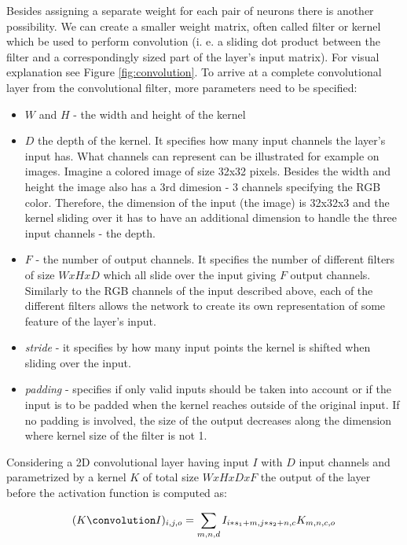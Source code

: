 Besides assigning a separate weight for each pair of neurons there is another possibility.
We can create a smaller weight matrix, often called filter or kernel which be used to perform convolution (i. e. a sliding dot product between the filter and a correspondingly sized part of the layer's input matrix). 
For visual explanation see Figure \ref{fig:convolution}.
To arrive at a complete convolutional layer from the convolutional filter, more parameters need to be specified:
\begin{itemize}
    \item $W$  and $H$ - the width and height of the kernel
    \item $D$ the depth of the kernel. 
    It specifies how many input channels the layer's input has.
    What channels can represent can be illustrated for example on images.
    Imagine a colored image of size 32x32 pixels.
    Besides the width and height the image also has a 3rd dimesion - 3 channels specifying the RGB color.
    Therefore, the dimension of the input (the image) is 32x32x3 and the kernel sliding over it has to have an additional dimension to handle the three input channels - the depth.
    \item $F$ - the number of output channels. 
    It specifies the number of different filters of size $WxHxD$ which all slide over the input giving $F$ output channels. 
    Similarly to the RGB channels of the input described above, each of the different filters allows the network to create its own representation of some feature of the layer's input.    
    \item \textit{stride} - it specifies by how many input points the kernel is shifted when sliding over the input. 
    \item \textit{padding} - specifies if only valid inputs should be taken into account or if the input is to be padded when the kernel reaches outside of the original input.
    If no padding is involved, the size of the output decreases along the dimension where kernel size of the filter is not 1.
\end{itemize}

Considering a 2D convolutional layer having input $I$ with $D$ input channels and parametrized by a kernel $K$ of total size $WxHxDxF$ the output of the layer before the activation function is computed as:

\begin{equation}
    (K \convolution I)_{i,j,o} = \sum_{m,n,d} I_{i*s_1+m,j*s_2+n,c} K_{m,n,c,o}
\end{equation}\label{eq:convolution}

